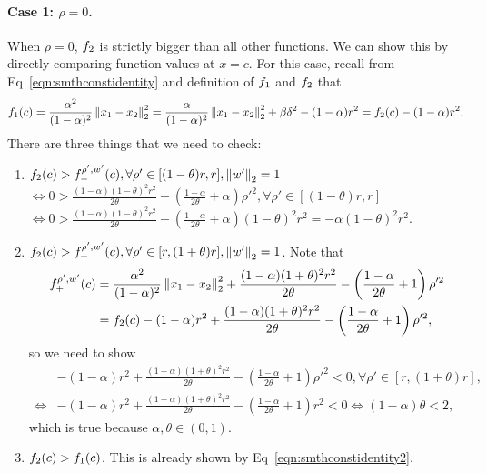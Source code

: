 \paragraph{Case 1: $\rho = 0$.}
When $\rho = 0$, $f_{2}$ is strictly bigger than all other functions.
We can show this by directly comparing function values at $x = c$.
For this case, recall from Eq~\eqref{eqn:smthconstidentity} and
definition of $f_{1}$ and $f_{2}$ that
\begin{equation}
\label{eqn:smthconstidentity2}
f_{1}(c) 
=
\frac{\alpha^2}{(1-\alpha)^2} \left\|{x_1-x_2}\right\|_2^2 
= 
\frac{\alpha}{(1-\alpha)^2} \left\|{x_1-x_2}\right\|_2^2 + \beta \delta^2 - (1-\alpha) r^2
= 
f_{2}(c) - (1-\alpha) r^2.
\end{equation}
There are three things that we need to check:
\begin{enumerate}
	\item $f_{2}(c) > f_-^{{\rho'},{w'}}(c), \forall \rho' \in [(1-\theta)r,r], \left\|{w'}\right\|_2 = 1$\\
	$\iff 0 > \frac{(1-\alpha)(1-\theta)^2 r^2}{2\theta} 
	- \left ( \frac{1-\alpha}{2\theta} + \alpha \right ) \rho'^2, 
	\forall \rho' \in [(1-\theta)r,r]$\\
	$\iff 0 > \frac{(1-\alpha)(1-\theta)^2 r^2}{2\theta} 
	- \left ( \frac{1-\alpha}{2\theta} + \alpha \right ) (1-\theta)^2 r^2 
	= -\alpha (1-\theta)^2 r^2$.
	\item $f_{2}(c) > f_+^{{\rho'},{w'}}(c), \forall \rho' \in [r,(1+\theta)r], \left\|{w'}\right\|_2 = 1$.
	Note that 
	\begin{align*}
		f_+^{{\rho'},{w'}}(c) &= \frac{\alpha^2}{(1-\alpha)^2} \left\|{x_1-x_2}\right\|_2^2 
		+ \frac{(1-\alpha)(1+\theta)^2 r^2}{2\theta} 
		- \left ( \frac{1-\alpha}{2\theta} + 1 \right ) \rho'^2\\
		&= f_{2}(c) - (1-\alpha) r^2 + \frac{(1-\alpha)(1+\theta)^2 r^2}{2\theta} 
		- \left ( \frac{1-\alpha}{2\theta} + 1 \right ) \rho'^2,
	\end{align*}
	so we need to show
	\begin{align*}
		&- (1-\alpha) r^2 + \frac{(1-\alpha)(1+\theta)^2 r^2}{2\theta} 
		- \left ( \frac{1-\alpha}{2\theta} + 1 \right ) \rho'^2<0, \forall \rho' \in [r,(1+\theta)r],\\
		\iff &- (1-\alpha) r^2 + \frac{(1-\alpha)(1+\theta)^2 r^2}{2\theta} 
		- \left ( \frac{1-\alpha}{2\theta} + 1 \right ) r^2<0
		\iff (1-\alpha) \theta < 2,
	\end{align*}
	which is true because $\alpha, \theta \in (0,1)$.
	\item $f_{2}(c) > f_{1}(c)$. This is already shown by Eq~\eqref{eqn:smthconstidentity2}.
\end{enumerate}

